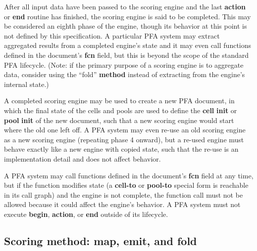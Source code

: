 \documentclass{article}
\newcommand{\PFAc}{\ttfamily\bfseries}
\theoremstyle{definition}
\begin{document}
After all input data have been passed to the scoring engine and the last {\PFAc action} or {\PFAc end} routine has finished, the scoring engine is said to be completed.  This may be considered an eighth phase of the engine, though its behavior at this point is not defined by this specification.  A particular PFA system may extract aggregated results from a completed engine's state and it may even call functions defined in the document's {\PFAc fcn} field, but this is beyond the scope of the standard PFA lifecycle.  (Note: if the primary purpose of a scoring engine is to aggregate data, consider using the ``fold'' {\PFAc method} instead of extracting from the engine's internal state.)

A completed scoring engine may be used to create a new PFA document, in which the final state of the cells and pools are used to define the {\PFAc cell} {\PFAc init} or {\PFAc pool} {\PFAc init} of the new document, such that a new scoring engine would start where the old one left off.  A PFA system may even re-use an old scoring engine as a new scoring engine (repeating phase 4 onward), but a re-used engine must behave exactly like a new engine with copied state, such that the re-use is an implementation detail and does not affect behavior.

A PFA system may call functions defined in the document's {\PFAc fcn} field at any time, but if the function modifies state (a {\PFAc cell-to} or {\PFAc pool-to} special form is reachable in its call graph) and the engine is not complete, the function call must not be allowed because it could affect the engine's behavior.  A PFA system must not execute {\PFAc begin}, {\PFAc action}, or {\PFAc end} outside of its lifecycle.

\hypertarget{hsec:method}{}
\subsection{Scoring method: map, emit, and fold}
\label{sec:method}
\end{document}
